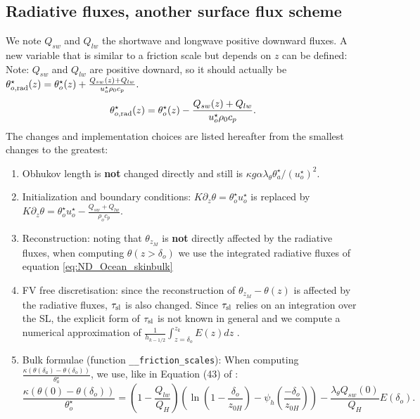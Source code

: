\subsection{Radiative fluxes, another surface flux scheme}
\label{sec:ND_Ocean_radiativeFluxes}
We note $Q_{sw}$ and $Q_{lw}$ the shortwave and longwave positive
downward fluxes. A new variable that is similar to a friction
scale but depends on $z$ can be defined:
{\color{red} Note: $Q_{sw}$ and $Q_{lw}$ are positive downard,
so it should actually be $\theta^\star_{o, \rm rad}(z) =
	\theta^\star_{o}(z) +
	\frac{Q_{sw}(z) + Q_{lw}}{u^{\star}_o\rho_0 c_p}.
$}
\begin{equation}
\theta^\star_{o, \rm rad}(z) =
	\theta^\star_{o}(z) -
	\frac{Q_{sw}(z) + Q_{lw}}{u^{\star}_o\rho_0 c_p}.
\end{equation}
The changes and implementation choices are listed hereafter from
the smallest changes to the greatest:
\begin{enumerate}
	\item Obhukov length is \textbf{not} changed directly and
		still is $\kappa g \alpha \lambda_\theta
		\theta^\star_a / (u^\star_o)^2$.
	\item Initialization and boundary conditions:
		$K\partial_z \theta = \theta^{\star}_o u^{\star}_o$
		is replaced by
		$K\partial_z \theta = \theta^{\star}_o u^{\star}_o
		- \frac{Q_{sw} + Q_{lw}}{\rho_o c_p}$.
	\item Reconstruction: noting that $\theta_{z_M}$ is
		\textbf{not} directly affected by the
		radiative fluxes, when computing $\theta(z>\delta_o)$
		we use the integrated radiative fluxes of
		equation \eqref{eq:ND_Ocean_skinbulk}
	\item FV free discretisation: since the reconstruction
		of $\theta_{z_M} - \theta(z)$ is affected by
		the radiative fluxes, $\tau_{\rm sl}$ is also
		changed. Since $\tau_{\rm sl}$ relies on an
		integration over the SL, the explicit form
		of $\tau_{\rm sl}$ is not known in general
		and we compute a numerical approximation of
		$\frac{1}{h_{k-1/2}}\int_{z=\delta_o}^{z_k}
		E(z) dz$
		.
	\item Bulk formulae (function \verb|__friction_scales|):
		When computing
		$\frac{\kappa (\theta(\delta_a) - \theta(\delta_o))}
		{\theta_a^{\star}}$,
		we use, like in
		Equation (43) of \citep{pelletier_two-sided_2021}:
	\begin{equation}
		\label{eq:ND_Ocean_skinbulk}
		\frac{\kappa (\theta(0) - \theta(\delta_o))}
		{\theta_o^{\star}} = (1 -
		\frac{Q_{lw}}{Q_H})
		\left(\ln (1 - \frac{\delta_o}{z_{0H}}) -
		\psi_h(\frac{-\delta_o}{z_{0H}})\right)
		- \frac{\lambda_\theta Q_{sw}(0)}
		{Q_H} E(\delta_o)
		.
	\end{equation}
\end{enumerate}

